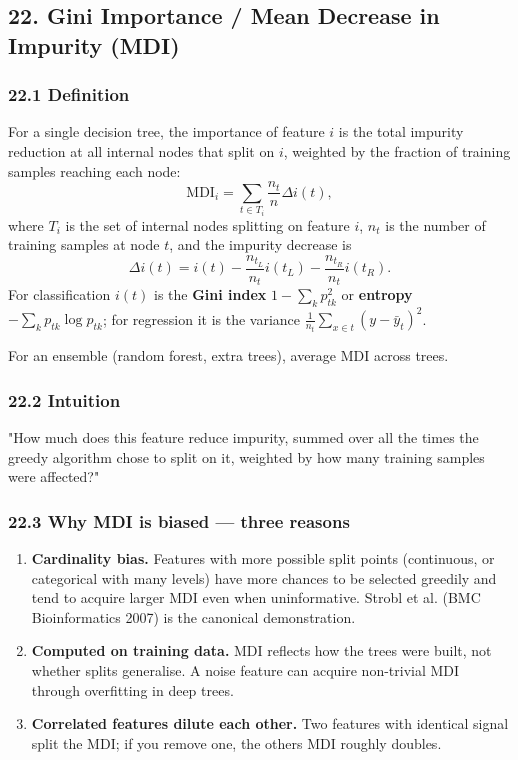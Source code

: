 \documentclass{article}
\providecommand{\tightlist}{\setlength{\itemsep}{0pt}\setlength{\parskip}{0pt}}
\begin{document}
\subsection{22. Gini Importance / Mean Decrease in Impurity
(MDI)}\label{22-gini-importance--mean-decrease-in-impurity-mdi}

\subsubsection{22.1 Definition}\label{221-definition}

For a single decision tree, the importance of feature \(i\) is the total
impurity reduction at all internal nodes that split on \(i\), weighted
by the fraction of training samples reaching each node: \[
\mathrm{MDI}_i = \sum_{t \in T_i} \frac{n_t}{n} \Delta i(t),
\] where \(T_i\) is the set of internal nodes splitting on feature
\(i\), \(n_t\) is the number of training samples at node \(t\), and the
impurity decrease is \[
\Delta i(t) = i(t) - \frac{n_{t_L}}{n_t} i(t_L) - \frac{n_{t_R}}{n_t} i(t_R).
\] For classification \(i(t)\) is the \textbf{Gini index}
\(1 - \sum_k p_{tk}^2\) or \textbf{entropy}
\(-\sum_k p_{tk} \log p_{tk}\); for regression it is the variance
\(\frac{1}{n_t}\sum_{x \in t}(y - \bar{y}_t)^2\).

For an ensemble (random forest, extra trees), average MDI across trees.

\subsubsection{22.2 Intuition}\label{222-intuition}

"How much does this feature reduce impurity, summed over all the times
the greedy algorithm chose to split on it, weighted by how many training
samples were affected?"

\subsubsection{22.3 Why MDI is biased --- three
reasons}\label{223-why-mdi-is-biased--three-reasons}

\begin{enumerate}
\def\labelenumi{\arabic{enumi}.}
\tightlist
\item
  \textbf{Cardinality bias.} Features with more possible split points
  (continuous, or categorical with many levels) have more chances to be
  selected greedily and tend to acquire larger MDI even when
  uninformative. Strobl et al. (BMC Bioinformatics 2007) is the
  canonical demonstration.
\item
  \textbf{Computed on training data.} MDI reflects how the trees were
  built, not whether splits generalise. A noise feature can acquire
  non-trivial MDI through overfitting in deep trees.
\item
  \textbf{Correlated features dilute each other.} Two features with
  identical signal split the MDI; if you remove one, the
  other\textquotesingle s MDI roughly doubles.
\end{enumerate}
\end{document}
